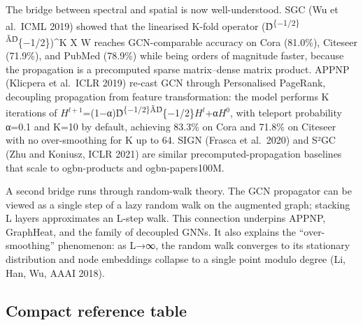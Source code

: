 The bridge between spectral and spatial is now well-understood. SGC (Wu et al.~ICML 2019) showed that the linearised K-fold operator (D̃\textsuperscript{\{−1/2\}ÃD̃}\{−1/2\})\^{}K X W reaches GCN-comparable accuracy on Cora (81.0\%), Citeseer (71.9\%), and PubMed (78.9\%) while being orders of magnitude faster, because the propagation is a precomputed sparse matrix--dense matrix product. APPNP (Klicpera et al.~ICLR 2019) re-cast GCN through Personalised PageRank, decoupling propagation from feature transformation: the model performs K iterations of \(H^{l+1}\)=(1−α)D̃\textsuperscript{\{−1/2\}ÃD̃}\{−1/2\}\(H^l\)+α\(H^0\), with teleport probability α=0.1 and K=10 by default, achieving 83.3\% on Cora and 71.8\% on Citeseer with no over-smoothing for K up to 64. SIGN (Frasca et al.~2020) and S²GC (Zhu and Koniusz, ICLR 2021) are similar precomputed-propagation baselines that scale to ogbn-products and ogbn-papers100M.

A second bridge runs through random-walk theory. The GCN propagator can be viewed as a single step of a lazy random walk on the augmented graph; stacking L layers approximates an L-step walk. This connection underpins APPNP, GraphHeat, and the family of decoupled GNNs. It also explains the ``over-smoothing'' phenomenon: as L→∞, the random walk converges to its stationary distribution and node embeddings collapse to a single point modulo degree (Li, Han, Wu, AAAI 2018).

\subsection{Compact reference table}\label{compact-reference-table}

